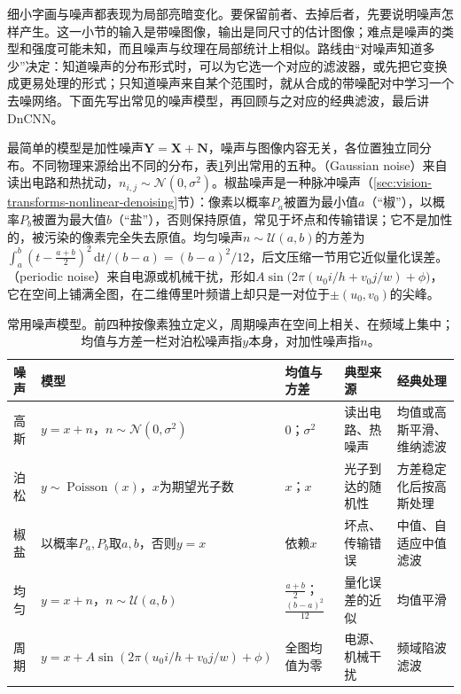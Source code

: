 细小字画与噪声都表现为局部亮暗变化。要保留前者、去掉后者，先要说明噪声怎样产生。这一小节的输入是带噪图像，输出是同尺寸的估计图像；难点是噪声的类型和强度可能未知，而且噪声与纹理在局部统计上相似。路线由“对噪声知道多少”决定：知道噪声的分布形式时，可以为它选一个对应的滤波器，或先把它变换成更易处理的形式；只知道噪声来自某个范围时，就从合成的带噪配对中学习一个去噪网络。下面先写出常见的噪声模型，再回顾与之对应的经典滤波，最后讲DnCNN。

最简单的模型是加性噪声$\bm{Y}=\bm{X}+\bm{N}$，噪声与图像内容无关，各位置独立同分布。不同物理来源给出不同的分布，表\ref{tab:vision-noise-models}列出常用的五种。（Gaussian noise）来自读出电路和热扰动，$n_{i,j}\sim\mathcal{N}(0,\sigma^2)$。椒盐噪声是一种脉冲噪声（\ref{sec:vision-transforms-nonlinear-denoising}节）：像素以概率$P_a$被置为最小值$a$（“椒”），以概率$P_b$被置为最大值$b$（“盐”），否则保持原值，常见于坏点和传输错误；它不是加性的，被污染的像素完全失去原值。均匀噪声$n\sim\mathcal{U}(a,b)$的方差为$\int_a^b(t-\tfrac{a+b}{2})^2\,\mathrm{d}t/(b-a)=(b-a)^2/12$，后文压缩一节用它近似量化误差。（periodic noise）来自电源或机械干扰，形如$A\sin\bigl(2\pi(u_0i/h+v_0j/w)+\phi\bigr)$，它在空间上铺满全图，在二维傅里叶频谱上却只是一对位于$\pm(u_0,v_0)$的尖峰。

\begin{table}[tbp]
 \centering
 \small
 \begin{tabularx}{\linewidth}{@{}p{16mm}p{40mm}p{28mm}XX@{}}
  \toprule
  噪声 & 模型 & 均值与方差 & 典型来源 & 经典处理\\
  \midrule
  高斯 & $y=x+n$，$n\sim\mathcal{N}(0,\sigma^2)$ & $0$；$\sigma^2$ & 读出电路、热噪声 & 均值或高斯平滑、维纳滤波\\
  泊松 & $y\sim\operatorname{Poisson}(x)$，$x$为期望光子数 & $x$；$x$ & 光子到达的随机性 & 方差稳定化后按高斯处理\\
  椒盐 & 以概率$P_a,P_b$取$a,b$，否则$y=x$ & 依赖$x$ & 坏点、传输错误 & 中值、自适应中值滤波\\
  均匀 & $y=x+n$，$n\sim\mathcal{U}(a,b)$ & $\frac{a+b}{2}$；$\frac{(b-a)^2}{12}$ & 量化误差的近似 & 均值平滑\\
  周期 & $y=x+A\sin(2\pi(u_0i/h+v_0j/w)+\phi)$ & 全图均值为零 & 电源、机械干扰 & 频域陷波滤波\\
  \bottomrule
 \end{tabularx}
 \caption{常用噪声模型。前四种按像素独立定义，周期噪声在空间上相关、在频域上集中；均值与方差一栏对泊松噪声指$y$本身，对加性噪声指$n$。}
 \label{tab:vision-noise-models}
\end{table}

